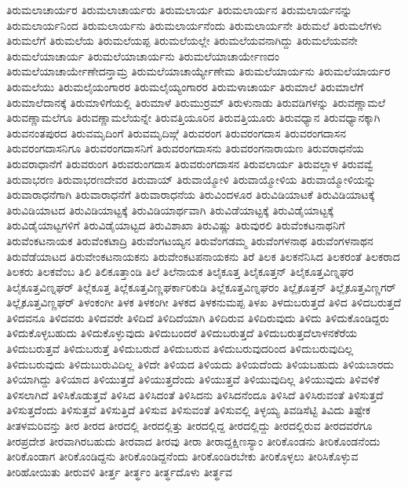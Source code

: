 {ತಿರುಮಲಾಚಾರ್ಯರ
ತಿರುಮಲಾಚಾರ್ಯರು
ತಿರುಮಲಾರ್ಯ
ತಿರುಮಲಾರ್ಯನ
ತಿರುಮಲಾರ್ಯನನ್ನು
ತಿರುಮಲಾರ್ಯನಿಂದ
ತಿರುಮಲಾರ್ಯನು
ತಿರುಮಲಾರ್ಯನೆಂದು
ತಿರುಮಲಾರ್ಯನೇ
ತಿರುಮಲೆ
ತಿರುಮಲೆಗಳು
ತಿರುಮಲೆಗೆ
ತಿರುಮಲೆಯ
ತಿರುಮಲೆಯಪ್ಪ
ತಿರುಮಲೆಯಲ್ಲೇ
ತಿರುಮಲೆಯವನಾಗಿದ್ದು
ತಿರುಮಲೆಯವನೇ
ತಿರುಮಲೆಯಾಚಾರ್ಯ
ತಿರುಮಲೆಯಾಚಾರ್ಯನು
ತಿರುಮಲೆಯಾಚಾರ್ಯೇಣದಂ
ತಿರುಮಲೆಯಾಚಾರ್ಯೇಣೇದನ್ತಾಮ್ರ
ತಿರುಮಲೆಯಾಚಾರ್ಯ್ಯೇಣೇಮ
ತಿರುಮಲೆಯಾರ್ಯನು
ತಿರುಮಲೆಯಾರ್ಯರ
ತಿರುಮಲೆಯು
ತಿರುಮಲೈಯಂಗಾರರ
ತಿರುಮಲೈಯ್ಯಂಗಾರರ
ತಿರುಮಳಾಚಾರ್ಯ
ತಿರುಮಾಲೆ
ತಿರುಮಾಲೆಗೆ
ತಿರುಮಾಲೆದಾನಕ್ಕೆ
ತಿರುಮಾಳಿಗೆಯಲ್ಲಿ
ತಿರುಮಾಳೆ
ತಿರುಮುರ್ರಮ್
ತಿರುಳುನಾಡು
ತಿರುವಡಿಗಳನ್ನು
ತಿರುವಣ್ಣಾಮಲೆ
ತಿರುವಣ್ಣಾಮಲೆಗೂ
ತಿರುವಣ್ಣಾಮಲೆಯನ್ನೇ
ತಿರುವತ್ತಿಯೂರಿನ
ತಿರುವತ್ತಿಯೂರು
ತಿರುವಧ್ಯಾನ
ತಿರುವಧ್ಯಾನಕ್ಕಾಗಿ
ತಿರುವನಂತಪುರದ
ತಿರುವಮೃದಿಂಗೆ
ತಿರುವಮೃದಿಙ್ಗೆ
ತಿರುವರಂಗ
ತಿರುವರಂಗದಾಸ
ತಿರುವರಂಗದಾಸನ
ತಿರುವರಂಗದಾಸನಿಗೂ
ತಿರುವರಂಗದಾಸನಿಗೆ
ತಿರುವರಂಗದಾಸನು
ತಿರುವರಂಗನಾರಾಯಣ
ತಿರುವರಾಧನೆಯ
ತಿರುವರಾಧಾನೆಗೆ
ತಿರುವರುಂಗ
ತಿರುವರುಂಗದಾಸ
ತಿರುವರುಂಗದಾಸನ
ತಿರುವಲಾರ್ಯ
ತಿರುವಲ್ಲಾಳ
ತಿರುವವ್ವೆ
ತಿರುವಾಭರಣ
ತಿರುವಾಭರಣದೇವರ
ತಿರುವಾಯ್
ತಿರುವಾಯ್ಮೋಳಿ
ತಿರುವಾಯ್ಮೋಳಿಯ
ತಿರುವಾಯ್ಮೋಳಿಯನ್ನು
ತಿರುವಾರಾಧನೆಗಾಗಿ
ತಿರುವಾರಾಧನೆಗೆ
ತಿರುವಾರಾಧನೆಯ
ತಿರುವಿಂದಳೂರ
ತಿರುವಿಡಿಯಾಟಕೆ
ತಿರುವಿಡಿಯಾಟಕ್ಕೆ
ತಿರುವಿಡಿಯಾಟದ
ತಿರುವಿಡಿಯಾಟ್ಟಕ್ಕೆ
ತಿರುವಿಡಿಯಾರ್ಥವಾಗಿ
ತಿರುವಿಡೆಯಾಟ್ಟಕ್ಕೆ
ತಿರುವಿಡೈಯಾಟ್ಟಕ್ಕೆ
ತಿರುವಿಡೈಯಾಟ್ಟಗಳಿಗೆ
ತಿರುವಿಡೈಯಾಟ್ಟದ
ತಿರುವಿಶಾಖಾ
ತಿರುವಿಷ್ಣು
ತಿರುವುರಲಿ
ತಿರುವೆಂಕಟನಾಥನಿಗೆ
ತಿರುವೆಂಕಟನಾಯಕ
ತಿರುವೆಂಕಟಾದ್ರಿ
ತಿರುವೆಂಗಟಯ್ಯನ
ತಿರುವೆಂಗಡಮ್ಮ
ತಿರುವೆಂಗಳನಾಥ
ತಿರುವೆಂಗಳನಾಥನ
ತಿರುವೆಡೆಯಾಟದ
ತಿರುವೇಂಕಟನಾಯಕನು
ತಿರುವೇಂಕಟಪನಾಯಕನು
ತಿರೆ
ತಿಲಕ
ತಿಲಕನೆನಿಸಿದ
ತಿಲಕರಂತೆ
ತಿಲಕರಾದ
ತಿಲಕರು
ತಿಲಕವೆಂಬ
ತಿಲಿ
ತಿಲಿಕೂತ್ತಾಂಡಿ
ತಿಲೆ
ತಿಲೆನಾಯಕ
ತಿಲೈಕೂತ್ತ
ತಿಲೈಕೂತ್ತನ್
ತಿಲೈಕೂತ್ತವಿಣ್ನಘರ
ತಿಲೈಕೂತ್ತವಿಣ್ನಘರ್
ತಿಲ್ಲೆಕೂತ್ತ
ತಿಲ್ಲೆಕೂತ್ತವಿಣ್ಣಘರ್ಕಾರಿಕುಡಿ
ತಿಲ್ಲೆಕೂತ್ತವಿಣ್ನಘರಂ
ತಿಲ್ಲೈಕೂತ್ತನ್
ತಿಲ್ಲೈಕೂತ್ತವಿಣ್ಣಗರ್
ತಿಲ್ಲೈಕೂತ್ತವಿಣ್ಣಘರ್
ತಿಳಂಕಂಗೀ
ತಿಳಕ
ತಿಳಕಂಗೀ
ತಿಳಕದ
ತಿಳಕನುಮಪ್ಪ
ತಿಳಖ
ತಿಳದುಬರುತ್ತದೆ
ತಿಳಿದ
ತಿಳಿದಬರುತ್ತದೆ
ತಿಳಿದವನೂ
ತಿಳಿದವರು
ತಿಳಿದವರೇ
ತಿಳಿದಿದೆ
ತಿಳಿದಿದೆಯಾಗಿ
ತಿಳಿದಿರುವ
ತಿಳಿದಿರುವುದು
ತಿಳಿದು
ತಿಳಿದುಕೊಂಡಿದ್ದರು
ತಿಳಿದುಕೊಳ್ಳಬಹುದು
ತಿಳಿದುಕೊಳ್ಳುವುದು
ತಿಳಿದುಬಂದರೆ
ತಿಳಿದುಬರುತ್ತದೆ
ತಿಳಿದುಬರುತ್ತದೆಲಾಳನಕೆರೆಯ
ತಿಳಿದುಬರುತ್ತವೆ
ತಿಳಿದುಬರುತ್ತೆ
ತಿಳಿದುಬರುದೆ
ತಿಳಿದುಬರುವ
ತಿಳಿದುಬರುವುದರಿಂದ
ತಿಳಿದುಬರುವುದಿಲ್ಲ
ತಿಳಿದುಬರುವುದು
ತಿಳಿದುಬುರುವಿದಿಲ್ಲ
ತಿಳಿದೇ
ತಿಳಿಯದ
ತಿಳಿಯದು
ತಿಳಿಯದೆಂದು
ತಿಳಿಯಬಹುದು
ತಿಳಿಯಬಾರದು
ತಿಳಿಯಾಗಿದ್ದು
ತಿಳಿಯಾದ
ತಿಳಿಯುತ್ತದೆ
ತಿಳಿಯುತ್ತದೆಂದು
ತಿಳಿಯುತ್ತವೆ
ತಿಳಿಯುವುದಿಲ್ಲ
ತಿಳಿಯುವುದು
ತಿಳಿವಳಿಕೆ
ತಿಳಿಸಲಾಗಿದೆ
ತಿಳಿಸಿಕೊಡುತ್ತವೆ
ತಿಳಿಸಿದ
ತಿಳಿಸಿದಂತೆ
ತಿಳಿಸಿದನು
ತಿಳಿಸಿದನೆಂದೂ
ತಿಳಿಸಿದೆ
ತಿಳಿಸಿರುವಂತೆ
ತಿಳಿಸುತ್ತದೆ
ತಿಳಿಸುತ್ತದೆಂದು
ತಿಳಿಸುತ್ತವೆ
ತಿಳಿಸುತ್ತಿದೆ
ತಿಳಿಸುವ
ತಿಳಿಸುವಂತೆ
ತಿಳಿಸುವಲ್ಲಿ
ತಿಳ್ಳಯ್ಯ
ತಿವಡಿಸೆಟ್ಟಿ
ತಿವಿದು
ತಿಷ್ಟೇಕ
ತೀತಳಮರಿವನ್ತು
ತೀರ
ತೀರದ
ತೀರದಲ್ಲಿ
ತೀರದಲ್ಲಿತ್ತು
ತೀರದಲ್ಲಿದ್ದ
ತೀರದಲ್ಲಿದ್ದು
ತೀರದಲ್ಲಿರುವ
ತೀರದವರೆಗೂ
ತೀರಪ್ರದೇಶ
ತೀರವಾಗಿರಬಹುದು
ತೀರವಾದ
ತೀರವು
ತೀರಾ
ತೀರಾದ್ದಕ್ಷಿಣಸ್ಯಾಂ
ತೀರಿಕೊಂಡನು
ತೀರಿಕೊಂಡನೆಂದು
ತೀರಿಕೊಂಡಾಗ
ತೀರಿಕೊಂಡಿದ್ದನು
ತೀರಿಕೊಂಡಿದ್ದನೆಂದು
ತೀರಿಕೊಂಡಿರಬೇಕು
ತೀರಿಕೊಳ್ಳಲು
ತೀರಿಸಿಕೊಳ್ಳುವ
ತೀರಿಹೋಯಿತು
ತೀರುವಳಿ
ತೀರ್ತ್ತ
ತೀರ್ತ್ಥಂ
ತೀರ್ತ್ಥದೊಳು
ತೀರ್ತ್ಥವ
}
